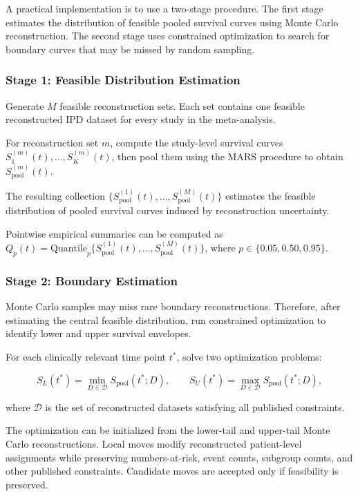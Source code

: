 \documentclass[11pt]{article}
\begin{document}
A practical implementation is to use a two-stage procedure. The first stage estimates the distribution of feasible pooled survival curves using Monte Carlo reconstruction. The second stage uses constrained optimization to search for boundary curves that may be missed by random sampling.

\subsubsection*{Stage 1: Feasible Distribution Estimation}

Generate \(M\) feasible reconstruction sets. Each set contains one feasible reconstructed IPD dataset for every study in the meta-analysis.

For reconstruction set \(m\), compute the study-level survival curves \(S^{(m)}_1(t),\ldots,S^{(m)}_K(t)\), then pool them using the MARS procedure to obtain \(S^{(m)}_{\text{pool}}(t)\).

The resulting collection \(\{S^{(1)}_{\text{pool}}(t),\ldots,S^{(M)}_{\text{pool}}(t)\}\) estimates the feasible distribution of pooled survival curves induced by reconstruction uncertainty.

Pointwise empirical summaries can be computed as \(Q_p(t)=\text{Quantile}_p\{S^{(1)}_{\text{pool}}(t),\ldots,S^{(M)}_{\text{pool}}(t)\}\), where \(p\in\{0.05,0.50,0.95\}\).

\subsubsection*{Stage 2: Boundary Estimation}

Monte Carlo samples may miss rare boundary reconstructions. Therefore, after estimating the central feasible distribution, run constrained optimization to identify lower and upper survival envelopes.

For each clinically relevant time point \(t^\ast\), solve two optimization problems:

\[
S_L(t^\ast)=\min_{D\in\mathcal D} S_{\text{pool}}(t^\ast;D), \qquad S_U(t^\ast)=\max_{D\in\mathcal D} S_{\text{pool}}(t^\ast;D),
\]

where \(\mathcal D\) is the set of reconstructed datasets satisfying all published constraints.

The optimization can be initialized from the lower-tail and upper-tail Monte Carlo reconstructions. Local moves modify reconstructed patient-level assignments while preserving numbers-at-risk, event counts, subgroup counts, and other published constraints. Candidate moves are accepted only if feasibility is preserved.
\end{document}
